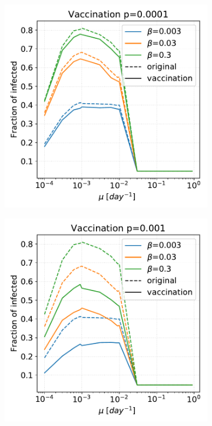 \documentclass[a4paper,11pt, twocolumn]{article}
\begin{document}
\begin{figure}[t!]
\begin{subfigure}[t]{0.32\textwidth}
\centering
\includegraphics[scale=0.30]{./Figure/Simulations/SIR_vax/remove_0001.pdf}
\caption{}
\end{subfigure}
\begin{subfigure}[t]{0.32\textwidth}
\centering
\includegraphics[scale=0.30]{./Figure/Simulations/SIR_vax/remove_001.pdf}

\end{subfigure}
\end{figure}
\end{document}
